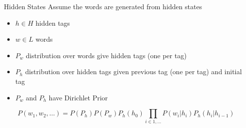 \documentclass[11pt]{beamer}
\begin{document}
	\begin{frame}{Hidden States}
		\centering
		Assume the words are generated from hidden states
		
		\vspace{10pt}
		\begin{itemize}
			\item $h \in H$ hidden tags
			\item $w \in L$ words
			\item $P_w$ distribution over words give hidden tags (one per tag)
			\item $P_h$ distribution over hidden tags given previous tag (one per tag) and initial tag
			\item $P_w$ and $P_h$ have Dirichlet Prior
		\end{itemize}
		
		$$P(w_1,w_2,\dots) = P(P_h)P(P_w) P_h(h_0) \prod_{i \in 1,\dots} P(w_i|h_i)P_h(h_i|h_{i-1})$$
	\end{frame}
	
	
		
\end{document}
